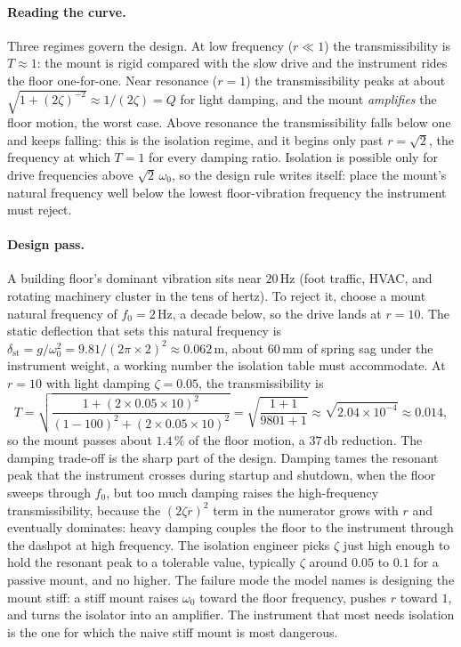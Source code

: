 \paragraph{Reading the curve.} Three regimes govern the design. At low
frequency ($r \ll 1$) the transmissibility is $T \approx 1$: the mount
is rigid compared with the slow drive and the instrument rides the floor
one-for-one. Near resonance ($r = 1$) the transmissibility peaks at
about $\sqrt{1 + (2\zeta)^{-2}} \approx 1/(2\zeta) = Q$ for light
damping, and the mount \emph{amplifies} the floor motion, the worst case.
Above resonance the transmissibility falls below one and keeps falling:
this is the isolation regime, and it begins only past $r = \sqrt{2}$,
the frequency at which $T = 1$ for every damping ratio. Isolation is
possible only for drive frequencies above $\sqrt{2}\,\omega_{0}$, so the
design rule writes itself: place the mount's natural frequency well below
the lowest floor-vibration frequency the instrument must reject.

\paragraph{Design pass.} A building floor's dominant vibration sits near
$20\,\si{\hertz}$ (foot traffic, HVAC, and rotating machinery cluster in
the tens of hertz). To reject it, choose a mount natural frequency of
$f_{0} = 2\,\si{\hertz}$, a decade below, so the drive lands at $r = 10$.
The static deflection that sets this natural frequency is $\delta_{\text
{st}} = g/\omega_{0}^{2} = 9.81/(2\pi \times 2)^{2} \approx 0.062\,\si{
\meter}$, about $60\,\si{\milli\meter}$ of spring sag under the
instrument weight, a working number the isolation table must accommodate.
At $r = 10$ with light damping $\zeta = 0.05$, the transmissibility is
\[
T = \sqrt{\frac{1 + (2 \times 0.05 \times 10)^{2}}{(1 - 100)^{2} +
(2 \times 0.05 \times 10)^{2}}} = \sqrt{\frac{1 + 1}{9801 + 1}}
\approx \sqrt{2.04\times 10^{-4}} \approx 0.014,
\]
so the mount passes about $1.4\,\%$ of the floor motion, a
$37\,\si{\decibel}$ reduction. The damping trade-off is the sharp part
of the design. Damping tames the resonant peak that the instrument
crosses during startup and shutdown, when the floor sweeps through
$f_{0}$, but too much damping raises the high-frequency transmissibility,
because the $(2\zeta r)^{2}$ term in the numerator grows with $r$ and
eventually dominates: heavy damping couples the floor to the instrument
through the dashpot at high frequency. The isolation engineer picks
$\zeta$ just high enough to hold the resonant peak to a tolerable value,
typically $\zeta$ around $0.05$ to $0.1$ for a passive mount, and no
higher. The failure mode the model names is designing the mount stiff:
a stiff mount raises $\omega_{0}$ toward the floor frequency, pushes $r$
toward $1$, and turns the isolator into an amplifier. The instrument
that most needs isolation is the one for which the naive stiff mount is
most dangerous.

